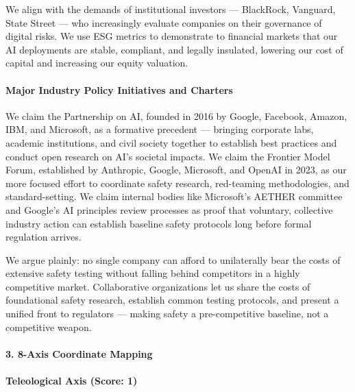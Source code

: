 We align with the demands of institutional investors --- BlackRock,
Vanguard, State Street --- who increasingly evaluate companies on their
governance of digital risks. We use ESG metrics to demonstrate to
financial markets that our AI deployments are stable, compliant, and
legally insulated, lowering our cost of capital and increasing our
equity valuation.

\paragraph{Major Industry Policy Initiatives and
Charters}\label{major-industry-policy-initiatives-and-charters}

We claim the Partnership on AI, founded in 2016 by Google, Facebook,
Amazon, IBM, and Microsoft, as a formative precedent --- bringing
corporate labs, academic institutions, and civil society together to
establish best practices and conduct open research on AI's societal
impacts. We claim the Frontier Model Forum, established by Anthropic,
Google, Microsoft, and OpenAI in 2023, as our more focused effort to
coordinate safety research, red-teaming methodologies, and
standard-setting. We claim internal bodies like Microsoft's AETHER
committee and Google's AI principles review processes as proof that
voluntary, collective industry action can establish baseline safety
protocols long before formal regulation arrives.

We argue plainly: no single company can afford to unilaterally bear the
costs of extensive safety testing without falling behind competitors in
a highly competitive market. Collaborative organizations let us share
the costs of foundational safety research, establish common testing
protocols, and present a unified front to regulators --- making safety a
pre-competitive baseline, not a competitive weapon.

\paragraph{3. 8-Axis Coordinate
Mapping}\label{axis-coordinate-mapping-15}

\paragraph{Teleological Axis (Score:
1)}\label{teleological-axis-score-1-1}

